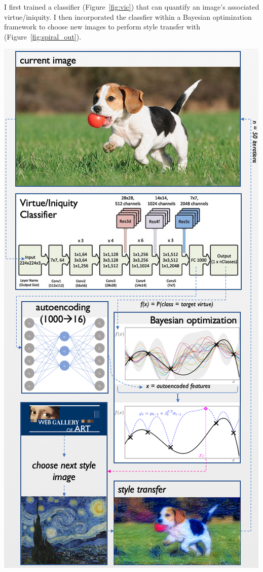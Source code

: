 \documentclass[paperwidth=30in,paperheight=40in,fontscale=0.35]{baposter} %
\begin{document}
\begin{poster}
{    I first trained a classifier (Figure~\ref{fig:vic}) that can quantify an image's
    associated virtue/iniquity. I then incorporated the classfier within a Bayesian
    optimization framework to choose new images to perform style transfer with
    (Figure~\ref{fig:spiral_out}).

    \begin{center}
        \vspace{-2mm}
        \includegraphics[width=\linewidth]{spiral_out}
        \label{fig:spiral_out}
    \end{center}
} %



\end{poster}
\end{document}

